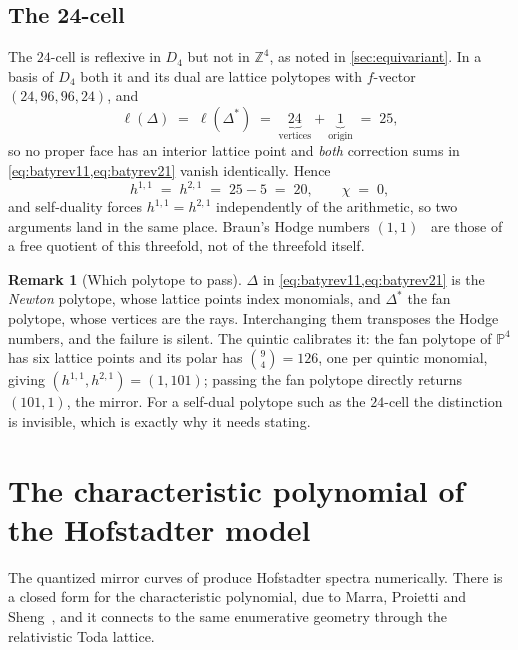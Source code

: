 \documentclass[11pt,a4paper]{article}
\newcommand{\PP}{\mathbb{P}}
\theoremstyle{definition}
\newtheorem{remark}{Remark}
\begin{document}
\subsection{The 24-cell}

The $24$-cell is reflexive in $D_4$ but not in $\mathbb{Z}^4$, as noted in
\cref{sec:equivariant}. In a basis of $D_4$ both it and its dual are lattice
polytopes with $f$-vector $(24, 96, 96, 24)$, and
%
\begin{equation}
\ell(\Delta) \;=\; \ell(\Delta^*) \;=\;
\underbrace{24}_{\text{vertices}} + \underbrace{1}_{\text{origin}} \;=\; 25 ,
\end{equation}
%
so no proper face has an interior lattice point and \emph{both} correction sums
in \cref{eq:batyrev11,eq:batyrev21} vanish identically. Hence
%
\begin{equation}
h^{1,1} \;=\; h^{2,1} \;=\; 25 - 5 \;=\; 20 ,
\qquad \chi \;=\; 0 ,
\end{equation}
%
and self-duality forces $h^{1,1} = h^{2,1}$ independently of the arithmetic, so
two arguments land in the same place. Braun's Hodge numbers
$(1,1)$~\cite{Braun2011} are those of a free quotient of this threefold, not
of the threefold itself.

\begin{remark}[Which polytope to pass]
$\Delta$ in \cref{eq:batyrev11,eq:batyrev21} is the \emph{Newton} polytope,
whose lattice points index monomials, and $\Delta^*$ the fan polytope, whose
vertices are the rays. Interchanging them transposes the Hodge numbers, and
the failure is silent. The quintic calibrates it: the fan polytope of $\PP^4$
has six lattice points and its polar has $\binom{9}{4} = 126$, one per quintic
monomial, giving $(h^{1,1}, h^{2,1}) = (1, 101)$; passing the fan polytope
directly returns $(101,1)$, the mirror. For a self-dual polytope such as the
$24$-cell the distinction is invisible, which is exactly why it needs stating.
\end{remark}

\section{The characteristic polynomial of the Hofstadter model}
\label{sec:hofstadter}

The quantized mirror curves of \cite{SuppFigures} produce Hofstadter spectra
numerically. There is a closed form for the characteristic polynomial, due to
Marra, Proietti and Sheng~\cite{MarraProiettiSheng2024}, and it connects to the
same enumerative geometry through the relativistic Toda lattice.
\end{document}
